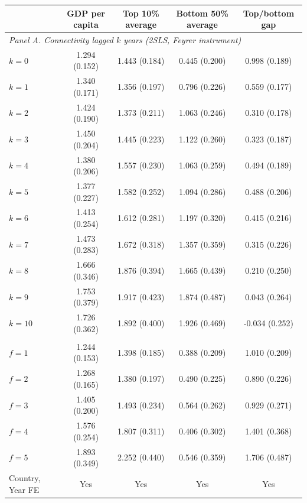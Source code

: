 \begin{tabular}{lcccc}
\toprule
 & GDP per capita & Top 10\% average & Bottom 50\% average & Top/bottom gap \\
\midrule
\multicolumn{5}{l}{\emph{Panel A. Connectivity lagged $k$ years (2SLS, Feyrer instrument)}}\\
$k=0$ & 1.294\sym{***} (0.152) & 1.443\sym{***} (0.184) & 0.445\sym{**} (0.200) & 0.998\sym{***} (0.189) \\
$k=1$ & 1.340\sym{***} (0.171) & 1.356\sym{***} (0.197) & 0.796\sym{***} (0.226) & 0.559\sym{***} (0.177) \\
$k=2$ & 1.424\sym{***} (0.190) & 1.373\sym{***} (0.211) & 1.063\sym{***} (0.246) & 0.310\sym{*} (0.178) \\
$k=3$ & 1.450\sym{***} (0.204) & 1.445\sym{***} (0.223) & 1.122\sym{***} (0.260) & 0.323\sym{*} (0.187) \\
$k=4$ & 1.380\sym{***} (0.206) & 1.557\sym{***} (0.230) & 1.063\sym{***} (0.259) & 0.494\sym{***} (0.189) \\
$k=5$ & 1.377\sym{***} (0.227) & 1.582\sym{***} (0.252) & 1.094\sym{***} (0.286) & 0.488\sym{**} (0.206) \\
$k=6$ & 1.413\sym{***} (0.254) & 1.612\sym{***} (0.281) & 1.197\sym{***} (0.320) & 0.415\sym{*} (0.216) \\
$k=7$ & 1.473\sym{***} (0.283) & 1.672\sym{***} (0.318) & 1.357\sym{***} (0.359) & 0.315 (0.226) \\
$k=8$ & 1.666\sym{***} (0.346) & 1.876\sym{***} (0.394) & 1.665\sym{***} (0.439) & 0.210 (0.250) \\
$k=9$ & 1.753\sym{***} (0.379) & 1.917\sym{***} (0.423) & 1.874\sym{***} (0.487) & 0.043 (0.264) \\
$k=10$ & 1.726\sym{***} (0.362) & 1.892\sym{***} (0.400) & 1.926\sym{***} (0.469) & -0.034 (0.252) \\
\addlinespace\multicolumn{5}{l}{\emph{Panel B. Placebo, connectivity led $f$ years}}\\
$f=1$ & 1.244\sym{***} (0.153) & 1.398\sym{***} (0.185) & 0.388\sym{*} (0.209) & 1.010\sym{***} (0.209) \\
$f=2$ & 1.268\sym{***} (0.165) & 1.380\sym{***} (0.197) & 0.490\sym{**} (0.225) & 0.890\sym{***} (0.226) \\
$f=3$ & 1.405\sym{***} (0.200) & 1.493\sym{***} (0.234) & 0.564\sym{**} (0.262) & 0.929\sym{***} (0.271) \\
$f=4$ & 1.576\sym{***} (0.254) & 1.807\sym{***} (0.311) & 0.406 (0.302) & 1.401\sym{***} (0.368) \\
$f=5$ & 1.893\sym{***} (0.349) & 2.252\sym{***} (0.440) & 0.546 (0.359) & 1.706\sym{***} (0.487) \\
\midrule
Country, Year FE & Yes & Yes & Yes & Yes \\
\bottomrule
\end{tabular}